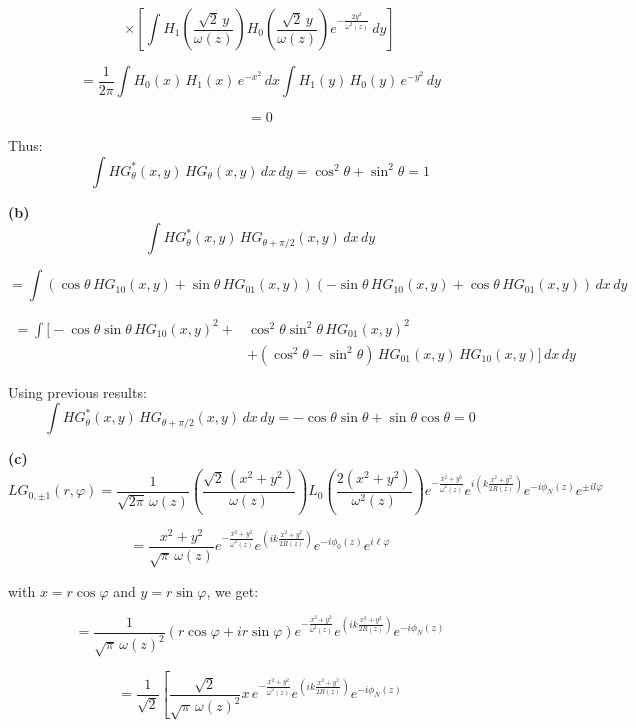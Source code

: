 \documentclass{article}
\begin{document}
\[
\times \left[ \int H_1 \left( \frac{\sqrt{2} \, y}{\omega(z)} \right) 
H_0 \left( \frac{\sqrt{2} \, y}{\omega(z)} \right) 
e^{- \frac{2 y^2}{\omega^2(z)}} \, dy \right]
\]

\[
= \frac{1}{2 \pi} \int H_0(x) \, H_1(x) \, e^{-x^2} \, dx 
\int H_1(y) \, H_0(y) \, e^{-y^2} \, dy
\]

\[
= 0
\]

Thus:
\[
\int HG_{\theta}^*(x, y) \, HG_{\theta}(x, y) \, dx \, dy = \cos^2 \theta + \sin^2 \theta = 1
\]

\textbf{(b)}
\[
\int HG_{\theta}^*(x, y) \, HG_{\theta + \pi/2}(x, y) \, dx \, dy
\]

\[
= \int \left( \cos \theta \, HG_{10}(x, y) + \sin \theta \, HG_{01}(x, y) \right)
\left( -\sin \theta \, HG_{10}(x, y) + \cos \theta \, HG_{01}(x, y) \right) \, dx \, dy
\]

\begin{align*}
    = \int \Big[ -\cos \theta \sin \theta \, HG_{10}(x, y)^2 +& \cos^2 \theta \sin^2 \theta \, HG_{01}(x, y)^2 \\
    &
+ (\cos^2 \theta - \sin^2 \theta) \, HG_{01}(x, y) \, HG_{10}(x, y) \Big] \, dx \, dy
\end{align*}


Using previous results:
\[
\int HG_{\theta}^*(x, y) \, HG_{\theta + \pi/2}(x, y) \, dx \, dy= -\cos \theta \sin \theta + \sin \theta \cos \theta = 0
\]

\textbf{(c)}
\[
LG_{0,\pm1}(r,\varphi) = \frac{1}{\sqrt{2\pi} \, \omega(z)} \left( \frac{\sqrt{2} \, (x^2 + y^2)}{\omega(z)} \right) 
L_0 \left( \frac{2 (x^2 + y^2)}{\omega^2(z)} \right) e^{-\frac{x^2 + y^2}{\omega^2(z)}} e^{i \left( k \frac{x^2 + y^2}{2R(z)} \right)} e^{-i \phi_N(z)} e^{\pm i l \varphi}
\]



\[
= \frac{x^2 + y^2}{\sqrt{\pi} \, \omega(z)} e^{-\frac{x^2 + y^2}{\omega^2(z)}}
e^{\left( i k \frac{x^2 + y^2}{2R(z)} \right)} e^{-i \phi_0(z)} e^{i \ell \varphi}
\]

with \(x = r \cos \varphi\) and \(y = r \sin \varphi\), we get:

\[
= \frac{1}{\sqrt{\pi} \, \omega(z)^2} \left( r \cos \varphi + i r \sin \varphi \right)
e^{-\frac{x^2 + y^2}{\omega^2(z)}} e^{\left( i k \frac{x^2 + y^2}{2R(z)} \right)} e^{-i \phi_N(z)}
\]

\[
= \frac{1}{\sqrt{2}} \left[ \frac{\sqrt{2}}{\sqrt{\pi} \, \omega(z)^2} 
x \, e^{-\frac{x^2 + y^2}{\omega^2(z)}} e^{\left( i k \frac{x^2 + y^2}{2R(z)} \right)} e^{-i \phi_N(z)} \right.
\]
\end{document}
